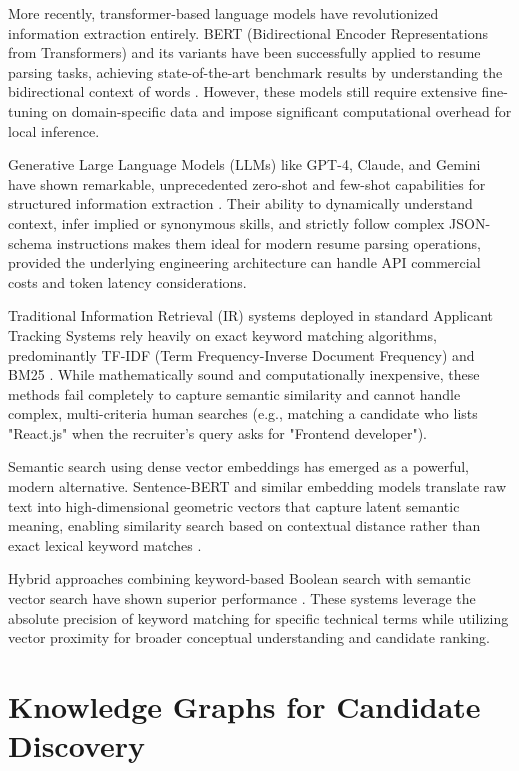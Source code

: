 \documentclass[12pt,a4paper]{report}
\begin{document}
More recently, transformer-based language models have revolutionized information extraction entirely. BERT (Bidirectional Encoder Representations from Transformers) and its variants have been successfully applied to resume parsing tasks, achieving state-of-the-art benchmark results by understanding the bidirectional context of words \cite{bert-resume}. However, these models still require extensive fine-tuning on domain-specific data and impose significant computational overhead for local inference.

Generative Large Language Models (LLMs) like GPT-4, Claude, and Gemini have shown remarkable, unprecedented zero-shot and few-shot capabilities for structured information extraction \cite{llm-extraction}. Their ability to dynamically understand context, infer implied or synonymous skills, and strictly follow complex JSON-schema instructions makes them ideal for modern resume parsing operations, provided the underlying engineering architecture can handle API commercial costs and token latency considerations.


Traditional Information Retrieval (IR) systems deployed in standard Applicant Tracking Systems rely heavily on exact keyword matching algorithms, predominantly TF-IDF (Term Frequency-Inverse Document Frequency) and BM25 \cite{tfidf}. While mathematically sound and computationally inexpensive, these methods fail completely to capture semantic similarity and cannot handle complex, multi-criteria human searches (e.g., matching a candidate who lists "React.js" when the recruiter's query asks for "Frontend developer").

Semantic search using dense vector embeddings has emerged as a powerful, modern alternative. Sentence-BERT and similar embedding models translate raw text into high-dimensional geometric vectors that capture latent semantic meaning, enabling similarity search based on contextual distance rather than exact lexical keyword matches \cite{sentence-bert}.

Hybrid approaches combining keyword-based Boolean search with semantic vector search have shown superior performance \cite{hybrid-search}. These systems leverage the absolute precision of keyword matching for specific technical terms while utilizing vector proximity for broader conceptual understanding and candidate ranking.

\section{Knowledge Graphs for Candidate Discovery}
\end{document}
